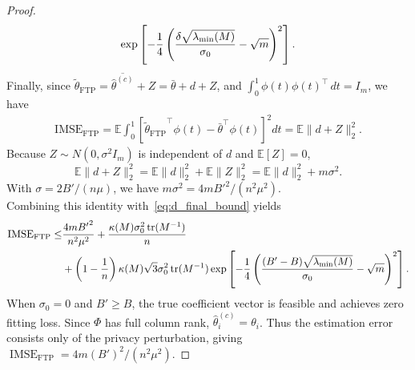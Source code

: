\begin{proof}
\begin{equation}
\exp\left[{
-\dfrac{1}{4}\left({
\dfrac{\delta\sqrt{\lambda_{\min}(M)}}{\sigma_0}
- \sqrt{m}
}\right)^2
}\right].
\label{eq:d_final_bound}
\end{equation}
Finally, since $\widetilde{\theta}_{\mathrm{FTP}}
=
\overline{\hat{\theta}^{(c)}}+Z
=
\bar{\theta}+d+Z$, and $\int_0^1\phi(t)\phi(t)^\top\,dt=I_m$, we have
\begin{align*}
\mathrm{IMSE}_{\mathrm{FTP}}
=
\mathbb E
\int_0^1
\left[
{\widetilde{\theta}_{\mathrm{FTP}}}^\top\phi(t)
-
\bar{\theta}^\top\phi(t)
\right]^2dt
=
\mathbb E\|d+Z\|_2^2.
\end{align*}
Because $Z\sim N(0,\sigma^2I_m)$ is independent of $d$ and
$\mathbb E[Z]=0$,
\[
\mathbb E\|d+Z\|_2^2
=
\mathbb E\|d\|_2^2
+
\mathbb E\|Z\|_2^2
=
\mathbb E\|d\|_2^2+m\sigma^2.
\]
With $\sigma=2B'/(n\mu)$, we have $m\sigma^2=4m{B'}^2/(n^2\mu^2)$.\\
Combining this identity with~\eqref{eq:d_final_bound} yields
\begin{equation}
\begin{aligned}
\mathrm{IMSE}_{\mathrm{FTP}}
\leq
&\frac{4m{B'}^2}{n^2\mu^2}
+
\dfrac{\kappa(M)\sigma_0^2
\operatorname{tr}(M^{-1})}{n}\\
&+
\left({1-\dfrac{1}{n}}\right)
\kappa(M)
\sqrt{3} \sigma_0^2 \operatorname{tr}(M^{-1})
\exp\left[{
-\dfrac{1}{4}\left({
\dfrac{(B'-B)\sqrt{\lambda_{\min}(M)}}{\sigma_0}
- \sqrt{m}
}\right)^2
}\right].
\end{aligned}
\label{eq: final_IMSE_FTP bound}
\end{equation}
When $\sigma_0=0$ and $B'\ge B$, the true coefficient vector is feasible and achieves zero fitting loss. Since $\Phi$ has full column rank, $\hat\theta_i^{(c)}=\theta_i$. Thus the estimation error consists only of the privacy perturbation, giving $\operatorname{IMSE}_{\mathrm{FTP}}=4m(B')^2/(n^2\mu^2)$.
\end{proof}